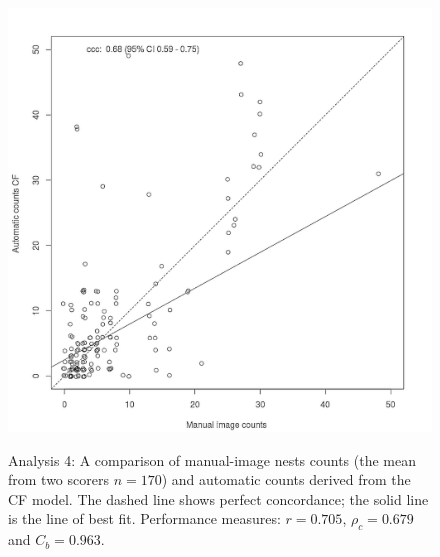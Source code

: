 \begin{figure}[!htbp]\myfloatalign
\includegraphics[width=1\linewidth]{gfx6/results/a4} \\
\caption[Manual image and automatic counts.]{Analysis 4: A comparison of manual-image nests counts (the mean from two scorers $ n=170 $) and automatic counts derived from the CF model. The dashed line shows perfect concordance; the solid line is the line of best fit. Performance measures: $r = 0.705$, $\rho_{c} = 0.679$  and $C_{b} = 0.963$.}  \label{fig:manual-image-automatic-c4}
\end{figure}

